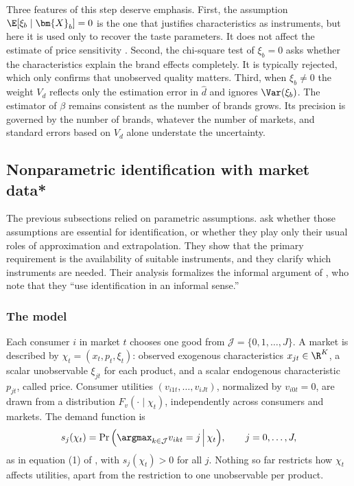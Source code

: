 Three features of this step deserve emphasis. First, the assumption $\E[\xi_b \mid \bm{X}_b] = 0$ is the one
that justifies characteristics as instruments, but here it is used only to recover the taste parameters. It
does not affect the estimate of price sensitivity \citep[p.~322, n.~19]{Nevo2001}. Second, the chi-square test
of $\xi_b = 0$ asks whether the characteristics explain the brand effects completely. It is typically rejected,
which only confirms that unobserved quality matters. Third, when $\xi_b \neq 0$ the weight $V_d$ reflects only
the estimation error in $\hat d$ and ignores $\Var(\xi_b)$. The estimator of $\beta$ remains consistent as the
number of brands grows. Its precision is governed by the number of brands, whatever the number of markets,
and standard errors based on $V_d$ alone understate the uncertainty.

\subsection{Nonparametric identification with market data*}\label{sec:08-bh14}

The previous subsections relied on parametric assumptions. \citet{BerryHaile2014} ask whether those
assumptions are essential for identification, or whether they play only their usual roles of approximation and
extrapolation. They show that the primary requirement is the availability of suitable instruments, and they
clarify which instruments are needed. Their analysis formalizes the informal argument of
\citet[p.~855, n.~13]{BerryLevinsohnPakes1995}, who note that they ``use identification in an informal sense.''

\subsubsection{The model}

Each consumer $i$ in market $t$ chooses one good from $\mathcal{J} = \{0, 1, \dots, J\}$. A market is described
by $\chi_t = (x_t, p_t, \xi_t)$: observed exogenous characteristics $x_{jt} \in \R^K$, a scalar unobservable
$\xi_{jt}$ for each product, and a scalar endogenous characteristic $p_{jt}$, called price. Consumer utilities
$(v_{i1t}, \dots, v_{iJt})$, normalized by $v_{i0t} = 0$, are drawn from a distribution $F_v(\cdot \mid
\chi_t)$, independently across consumers and markets. The demand function is
\begin{equation*}
  s_j(\chi_t) = \Pr\Big(\argmax_{k \in \mathcal{J}} v_{ikt} = j \,\Big|\, \chi_t\Big), \qquad j = 0, \dots,
  J,
\end{equation*}
as in equation (1) of \citet{BerryHaile2014}, with $s_j(\chi_t) > 0$ for all $j$. Nothing so far restricts how
$\chi_t$ affects utilities, apart from the restriction to one unobservable per product.


